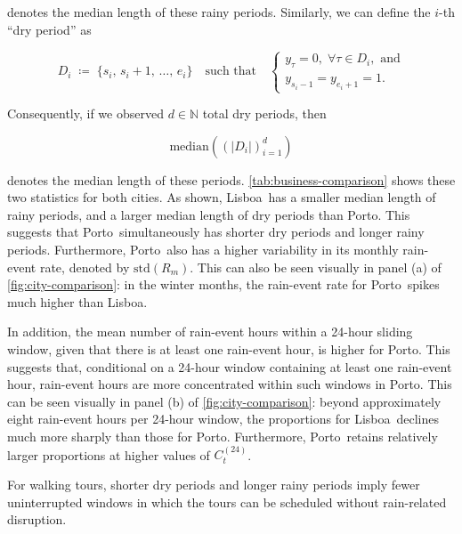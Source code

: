 \documentclass[11pt,a4paper]{article}
\newcommand{\CityA}{Lisboa}
\newcommand{\CityB}{Porto}
\begin{document}
	denotes the median length of these rainy periods. Similarly, we can define the $i$-th ``dry period'' as
	
	\begin{equation}
		D_i \;\coloneqq\; \{s_i,\,s_i+1,\,\dotsc,\,e_i\}
		\quad \text{such that} \quad
		\begin{cases}
			y_\tau = 0, \; \forall \tau \in D_i, \text{ and} \\
			y_{s_i-1} = y_{e_i+1} = 1.
		\end{cases}
	\end{equation}
	
	Consequently, if we observed $d \in \mathbb{N}$ total dry periods, then
	
	\begin{equation}
		\mathrm{median} \left(\left(\lvert D_i \rvert\right)_{i=1}^d \right)
	\end{equation}
	
	denotes the median length of these periods. \autoref{tab:business-comparison} shows these two statistics for both cities. As shown, \CityA\ has a smaller median length of rainy periods, and a larger median length of dry periods than \CityB. This suggests that \CityB\ simultaneously has shorter dry periods and longer rainy periods. Furthermore, \CityB\ also has a higher variability in its monthly rain-event rate, denoted by $\mathrm{std}(R_m)$. This can also be seen visually in panel (a) of \autoref{fig:city-comparison}: in the winter months, the rain-event rate for \CityB\ spikes much higher than \CityA.
	
	In addition, the mean number of rain-event hours within a 24-hour sliding window, given that there is at least one rain-event hour, is higher for \CityB. This suggests that, conditional on a 24-hour window containing at least one rain-event hour, rain-event hours are more concentrated within such windows in \CityB. This can be seen visually in panel (b) of \autoref{fig:city-comparison}: beyond approximately eight rain-event hours per 24-hour window, the proportions for \CityA\ declines much more sharply than those for \CityB. Furthermore, \CityB\ retains relatively larger proportions at higher values of $C^{(24)}_t$.
	
	For walking tours, shorter dry periods and longer rainy periods imply fewer uninterrupted windows in which the tours can be scheduled without rain-related disruption.
	
\end{document}
